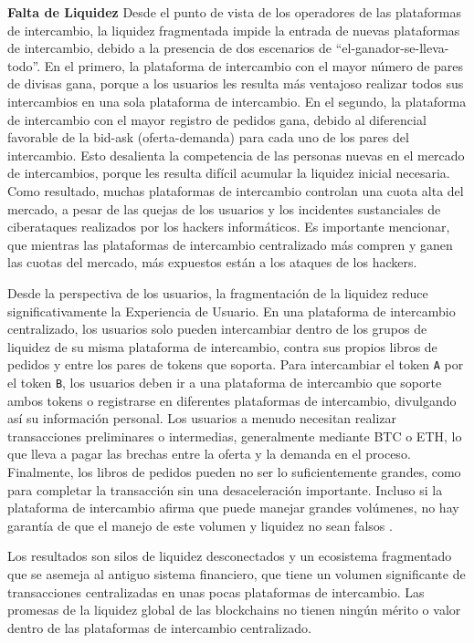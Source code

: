 \documentclass[UTF8,nofonts]{article}
\begin{document}
\begin{multicols}{2}
\textbf{Falta de Liquidez} Desde el punto de vista de los operadores de las plataformas de intercambio, la liquidez fragmentada impide la entrada de nuevas plataformas de intercambio, debido a la presencia de dos escenarios de \enquote{el-ganador-se-lleva-todo}. En el primero, la plataforma de intercambio con el mayor n\'umero de pares de divisas gana, porque a los usuarios les resulta m\'as ventajoso realizar todos sus intercambios en una sola plataforma de intercambio. En el segundo, la plataforma de intercambio con el mayor registro de pedidos gana, debido al diferencial favorable de la bid-ask (oferta-demanda) para cada uno de los pares del intercambio. Esto desalienta la competencia de las personas nuevas en el mercado de intercambios, porque les resulta dif\'icil acumular la liquidez inicial necesaria. Como resultado, muchas plataformas de intercambio controlan una cuota alta del mercado, a pesar de las quejas de los usuarios y los incidentes sustanciales de ciberataques realizados por los hackers inform\'aticos. Es importante mencionar, que mientras las plataformas de intercambio centralizado m\'as compren y ganen las cuotas del mercado, m\'as expuestos est\'an a los ataques de los hackers.

Desde la perspectiva de los usuarios, la fragmentaci\'on de la liquidez reduce significativamente la Experiencia de Usuario. En una plataforma de intercambio centralizado, los usuarios solo pueden intercambiar dentro de los grupos de liquidez de su misma plataforma de intercambio, contra sus propios libros de pedidos y entre los pares de tokens que soporta. Para intercambiar el token \verb|A| por el token  \verb|B|, los usuarios deben ir a una plataforma de intercambio que soporte ambos tokens o registrarse en diferentes plataformas de intercambio, divulgando as\'i su informaci\'on personal. Los usuarios a menudo necesitan realizar transacciones preliminares o intermedias, generalmente mediante BTC o ETH, lo que lleva a pagar las brechas entre la oferta y la demanda en el proceso. Finalmente, los libros de pedidos pueden no ser lo suficientemente grandes, como para completar la transacci\'on sin una desaceleraci\'on importante. Incluso si la plataforma de intercambio afirma que puede manejar grandes vol\'umenes, no hay garant\'ia de que el manejo de este volumen y liquidez no sean falsos \cite{fakevolume}.


Los resultados son silos de liquidez desconectados y un ecosistema fragmentado que se asemeja al antiguo sistema financiero, que tiene un volumen significante de transacciones centralizadas en unas pocas plataformas de intercambio. Las promesas de la liquidez global de las blockchains no tienen ning\'un m\'erito o valor dentro de las plataformas de intercambio centralizado.


\end{multicols}
\end{document}
